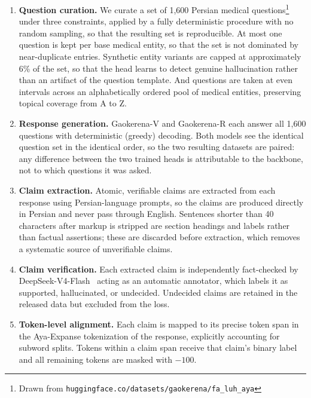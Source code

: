 \documentclass[review]{elsarticle}
\begin{document}
\begin{enumerate}

\item \textbf{Question curation.} We curate a set of 1{,}600 Persian medical questions\footnote{Drawn from \texttt{huggingface.co/datasets/gaokerena/fa\_luh\_aya}} under three constraints, applied by a fully deterministic procedure with no random sampling, so that the resulting set is reproducible. At most one question is kept per base medical entity, so that the set is not dominated by near-duplicate entries. Synthetic entity variants are capped at approximately 6\% of the set, so that the head learns to detect genuine hallucination rather than an artifact of the question template. And questions are taken at even intervals across an alphabetically ordered pool of medical entities, preserving topical coverage from A to Z.

\item \textbf{Response generation.} Gaokerena-V and Gaokerena-R each answer all 1{,}600 questions with deterministic (greedy) decoding. Both models see the identical question set in the identical order, so the two resulting datasets are paired: any difference between the two trained heads is attributable to the backbone, not to which questions it was asked.

\item \textbf{Claim extraction.} Atomic, verifiable claims are extracted from each response using Persian-language prompts, so the claims are produced directly in Persian and never pass through English. Sentences shorter than 40 characters after markup is stripped are section headings and labels rather than factual assertions; these are discarded before extraction, which removes a systematic source of unverifiable claims.

\item \textbf{Claim verification.} Each extracted claim is independently fact-checked by DeepSeek-V4-Flash~\cite{b36} acting as an automatic annotator, which labels it as supported, hallucinated, or undecided. Undecided claims are retained in the released data but excluded from the loss.

\item \textbf{Token-level alignment.} Each claim is mapped to its precise token span in the Aya-Expanse tokenization of the response, explicitly accounting for subword splits. Tokens within a claim span receive that claim's binary label and all remaining tokens are masked with $-100$.

\end{enumerate}
\end{document}
